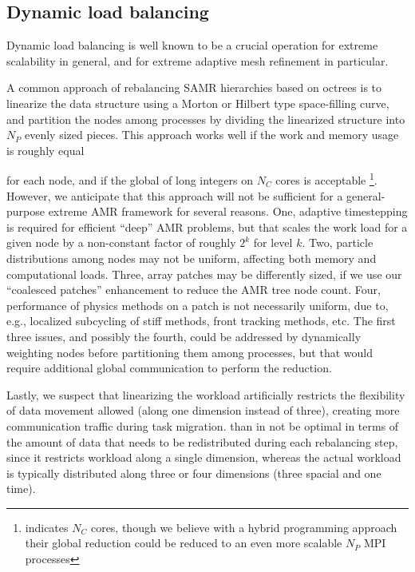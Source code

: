 \documentclass[14pt,letter]{article}
\begin{document}
\subsection{Dynamic load balancing} \label{ss:loadbalancing}

Dynamic load balancing is well known to be a crucial operation for
extreme scalability in general, and for extreme adaptive mesh
refinement in particular.

A common approach of rebalancing SAMR hierarchies based on octrees is
to linearize the data structure using a Morton or Hilbert type
space-filling curve, and partition the nodes among processes by
dividing the linearized structure into $N_P$ evenly sized pieces.
This approach works well if the work and memory usage is roughly equal

for each node, and if the global  of long
integers on $N_C$ cores is acceptable \footnote{\cite{BuGh08}
  indicates $N_C$ cores, though we believe with a hybrid programming
  approach their global reduction could be reduced to an even more
  scalable $N_P$ MPI processes}.  However, we anticipate that this
approach will not be sufficient for a general-purpose extreme AMR
framework for several reasons.
%
One, adaptive timestepping is required for efficient ``deep'' AMR
problems, but that scales the work load for a given node by a
non-constant factor of roughly $2^k$ for level $k$.
%
Two, particle distributions among nodes may not be uniform, affecting both memory and computational loads.
%
Three, array patches may be differently sized, if we use our ``coalesced patches'' enhancement to reduce the AMR tree node count.  
%
Four, performance of physics methods on a patch is not necessarily
uniform, due to, e.g., localized subcycling of stiff methods, front
tracking methods, etc.  The first three issues, and possibly the
fourth, could be addressed by dynamically weighting nodes before
partitioning them among processes, but that would require additional
global communication to perform the reduction.
%

Lastly, we suspect that linearizing the workload artificially
restricts the flexibility of data movement allowed (along one
dimension instead of three), creating more communication traffic
during task migration.  than in not be optimal in terms of the amount
of data that needs to be redistributed during each rebalancing step,
since it restricts workload along a single dimension, whereas the
actual workload is typically distributed along three or four
dimensions (three spacial and one time).
\end{document}
